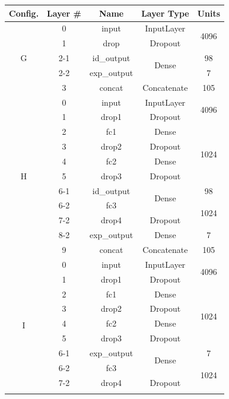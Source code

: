 \begin{table}[h!]
\begin{center}
\begin{tabular}{|c|c|c|c|c|}
\hline
\textbf{Config.} & \textbf{Layer \#} & \textbf{Name} & \textbf{Layer Type} & \textbf{Units} \\ \hline
\multirow{5}{*}{G} & 0 & input & InputLayer & \multirow{2}{*}{4096} \\ \cline{2-4}
& 1 & drop & Dropout & \\ \cline{2-5}
& 2-1 & id\_output & \multirow{2}{*}{Dense} & 98 \\ \cline{2-3} \cline{5-5}
& 2-2 & exp\_output & & 7 \\ \cline{2-5}
& 3 & concat & Concatenate & 105 \\ \hline
\multirow{11}{*}{H} & 0 & input & InputLayer & \multirow{2}{*}{4096} \\ \cline{2-4}
& 1 & drop1 & Dropout & \\ \cline{2-5}
& 2 & fc1 & Dense & \multirow{4}{*}{1024} \\ \cline{2-4}
& 3 & drop2 & Dropout & \\ \cline{2-4}
& 4 & fc2 & Dense & \\ \cline{2-4}
& 5 & drop3 & Dropout & \\ \cline{2-5}
& 6-1 & id\_output & \multirow{2}{*}{Dense} & 98 \\ \cline{2-3} \cline{5-5}
& 6-2 & fc3 & & \multirow{2}{*}{1024} \\ \cline{2-4}
& 7-2 & drop4 & Dropout & \\ \cline{2-5}
& 8-2 & exp\_output & Dense & 7 \\ \cline{2-5}
& 9 & concat & Concatenate & 105 \\ \hline
\multirow{11}{*}{I} & 0 & input & InputLayer & \multirow{2}{*}{4096} \\ \cline{2-4}
& 1 & drop1 & Dropout & \\ \cline{2-5}
& 2 & fc1 & Dense & \multirow{4}{*}{1024} \\ \cline{2-4}
& 3 & drop2 & Dropout & \\ \cline{2-4}
& 4 & fc2 & Dense & \\ \cline{2-4}
& 5 & drop3 & Dropout & \\ \cline{2-5}
& 6-1 & exp\_output & \multirow{2}{*}{Dense} & 7 \\ \cline{2-3} \cline{5-5}
& 6-2 & fc3 & & \multirow{2}{*}{1024} \\ \cline{2-4}
& 7-2 & drop4 & Dropout & \\ \cline{2-5}

\end{tabular}
\end{center}
\end{table}
